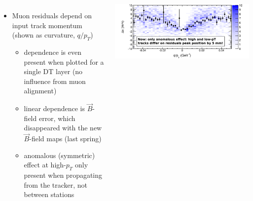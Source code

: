 \documentclass[compress]{beamer}
\begin{document}
\begin{frame}
\begin{columns}
\begin{itemize}
\item Muon residuals depend on input track momentum (shown as curvature, $q/p_T$)
\begin{itemize}
\item dependence is even present when plotted for a single DT layer (no influence from muon alignment)
\item linear dependence is $\vec{B}$-field error, which disappeared
  with the new $\vec{B}$-field maps (last spring)
\item anomalous (symmetric) effect at high-$p_T$ only present when
  propagating from the tracker, not between stations
\end{itemize}
\end{itemize}

\includegraphics[width=\linewidth]{residuals_real.pdf}
\end{columns}
\end{frame}
\end{document}
